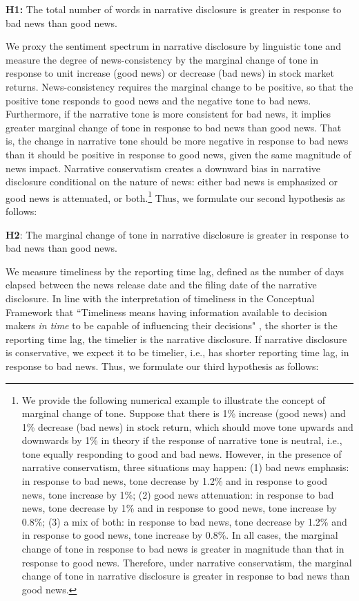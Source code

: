 \documentclass[a4paper]{article}
\begin{document}
\begin{spacing}{2}
\begin{center}
	\textbf{H1:} The total number of words in narrative disclosure is greater in response to bad news than good news.
\end{center}

We proxy the sentiment spectrum in narrative disclosure by linguistic tone and measure the degree of news-consistency by the marginal change of tone in response to unit increase (good news) or decrease (bad news) in stock market returns. News-consistency requires the marginal change to be positive, so that the positive tone responds to good news and the negative tone to bad news. Furthermore, if the narrative tone is more consistent for bad news, it implies greater marginal change of tone in response to bad news than good news. That is, the change in narrative tone should be more negative in response to bad news than it should be positive in response to good news, given the same magnitude of news impact. Narrative conservatism creates a downward bias in narrative disclosure conditional on the nature of news: either bad news is emphasized or good news is attenuated, or both.\footnote{We provide the following numerical example to illustrate the concept of marginal change of tone. Suppose that there is 1\% increase (good news) and 1\% decrease (bad news) in stock return, which should move tone upwards and downwards by 1\% in theory if the response of narrative tone is neutral, i.e., tone equally responding to good and bad news. However, in the presence of narrative conservatism, three situations may happen: (1) bad news emphasis: in response to bad news, tone decrease by 1.2\% and in response to good news, tone increase by 1\%; (2) good news attenuation: in response to bad news, tone decrease by 1\% and in response to good news, tone increase by 0.8\%; (3) a mix of both: in response to bad news, tone decrease by 1.2\% and in response to good news, tone increase by 0.8\%. In all cases, the marginal change of tone in response to bad news is greater in magnitude than that in response to good news. Therefore, under narrative conservatism, the marginal change of tone in narrative disclosure is greater in response to bad news than good news.} Thus, we formulate our second hypothesis as follows:
\begin{center}
	\textbf{H2}: The marginal change of tone in narrative disclosure is greater in response to bad news than good news.
\end{center}

We measure timeliness by the reporting time lag, defined as the number of days elapsed between the news release date and the filing date of the narrative disclosure. In line with the interpretation of timeliness in the Conceptual Framework that ``Timeliness means having information available to decision makers \textit{in time} to be capable of influencing their decisions" , the shorter is the reporting time lag, the timelier is the narrative disclosure. If narrative disclosure is conservative, we expect it to be timelier, i.e., has shorter reporting time lag, in response to bad news. Thus, we formulate our third hypothesis as follows:


\end{spacing}
\end{document}
